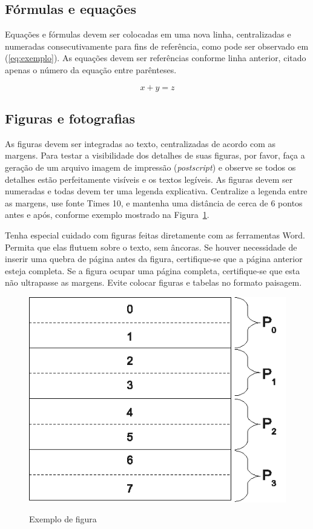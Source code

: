 \documentclass{RBCA}
\begin{document}
\subsection{Fórmulas e equações}
Equações e fórmulas devem ser colocadas em uma nova linha, centralizadas e numeradas consecutivamente para fins de referência,
como pode ser observado em (\ref{eq:exemplo}). As equações devem ser referências conforme linha anterior, citado apenas o número da equação entre parênteses.

\begin{equation}
x + y = z
\label{eq:exemplo}
\end{equation}

\subsection{Figuras e fotografias}
As figuras devem ser integradas ao texto, centralizadas de acordo com as margens. Para testar a visibilidade dos detalhes de suas figuras, por favor, faça a geração de um arquivo imagem de impressão (\emph{postscript}) e observe se todos os detalhes estão perfeitamente visíveis e os textos legíveis.  As figuras devem ser numeradas e todas devem ter uma legenda explicativa. Centralize a legenda entre as margens, use fonte Times 10, e mantenha uma distância de cerca de 6 pontos antes e após, conforme exemplo mostrado na Figura~\ref{fig:proc}.

Tenha especial cuidado com figuras feitas diretamente com as ferramentas Word. Permita que elas flutuem sobre o texto, sem âncoras. Se houver necessidade de inserir uma quebra de página antes da figura, certifique-se que a página anterior esteja completa. Se a figura ocupar uma página completa, certifique-se que esta não ultrapasse as margens. Evite colocar figuras e tabelas no formato paisagem.

\begin{figure}[ht]
\begin{center}
\caption{Exemplo de figura}
\includegraphics[scale=0.8]{figura.eps}
\label{fig:proc}
\end{center}
\end{figure}
\end{document}

